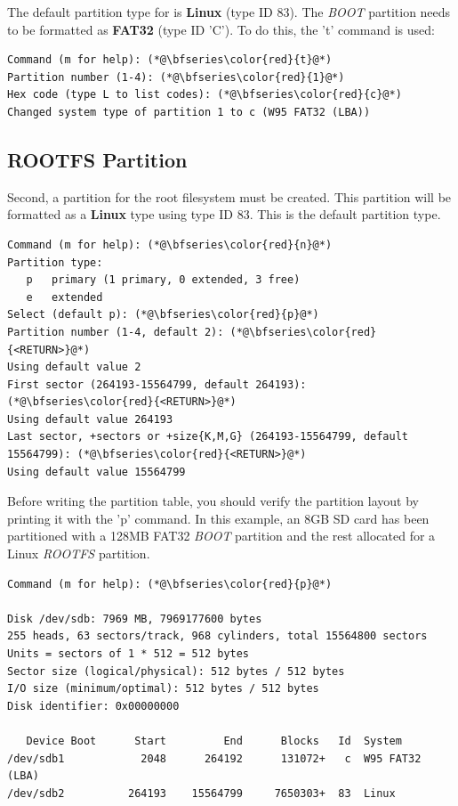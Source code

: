 The default partition type for  is \textbf{Linux} (type ID 83). The \textit{BOOT} partition needs to be formatted as \textbf{FAT32} (type ID 'C'). To do this, the 't' command is used:


\begin{lstlisting}[style=text]
Command (m for help): (*@\bfseries\color{red}{t}@*)
Partition number (1-4): (*@\bfseries\color{red}{1}@*)
Hex code (type L to list codes): (*@\bfseries\color{red}{c}@*)
Changed system type of partition 1 to c (W95 FAT32 (LBA))
\end{lstlisting}


\subsection{ROOTFS Partition}
Second, a partition for the root filesystem must be created. This partition will be formatted as a \textbf{Linux} type using type ID 83. This is the default partition type.


\begin{lstlisting}[style=text]
Command (m for help): (*@\bfseries\color{red}{n}@*)
Partition type:
   p   primary (1 primary, 0 extended, 3 free)
   e   extended
Select (default p): (*@\bfseries\color{red}{p}@*)
Partition number (1-4, default 2): (*@\bfseries\color{red}{<RETURN>}@*)
Using default value 2
First sector (264193-15564799, default 264193): (*@\bfseries\color{red}{<RETURN>}@*)
Using default value 264193
Last sector, +sectors or +size{K,M,G} (264193-15564799, default 15564799): (*@\bfseries\color{red}{<RETURN>}@*)
Using default value 15564799
\end{lstlisting}



Before writing the partition table, you should verify the partition layout by printing it with the 'p' command. In this example, an 8GB SD card has been partitioned with a 128MB FAT32 \textit{BOOT} partition and the rest allocated for a Linux \textit{ROOTFS} partition.


\begin{lstlisting}[style=text]
Command (m for help): (*@\bfseries\color{red}{p}@*)

Disk /dev/sdb: 7969 MB, 7969177600 bytes
255 heads, 63 sectors/track, 968 cylinders, total 15564800 sectors
Units = sectors of 1 * 512 = 512 bytes
Sector size (logical/physical): 512 bytes / 512 bytes
I/O size (minimum/optimal): 512 bytes / 512 bytes
Disk identifier: 0x00000000

   Device Boot      Start         End      Blocks   Id  System
/dev/sdb1            2048      264192      131072+   c  W95 FAT32 (LBA)
/dev/sdb2          264193    15564799     7650303+  83  Linux
\end{lstlisting}


